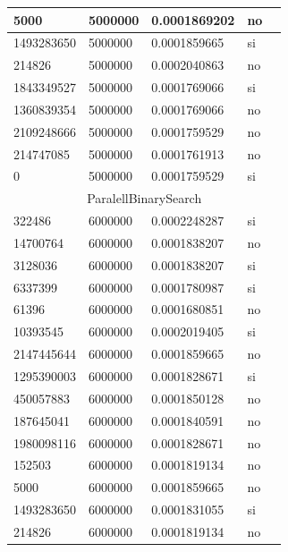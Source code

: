 \documentclass[12pt, fleqn]{article}                             %
\theoremstyle{break}                                            %
\begin{document}
\begin{longtable}{|m{5em}|m{5em}|m{10em}|m{5em}|@{}m{0pt}@{}}
            5000& 5000000  & 0.0001869202 & no &\\[1em]    \hline
            1493283650& 5000000  & 0.0001859665 & si &\\[1em]    \hline
            214826& 5000000  & 0.0002040863 & no &\\[1em]    \hline
            1843349527& 5000000  & 0.0001769066 & si &\\[1em]    \hline
            1360839354& 5000000  & 0.0001769066 & no &\\[1em]    \hline
            2109248666& 5000000  & 0.0001759529 & no &\\[1em]    \hline
            214747085& 5000000  & 0.0001761913 & no &\\[1em]    \hline
            0& 5000000  & 0.0001759529 & si &\\[1em]    \hline
            \multicolumn{5}{|c|}{ParalellBinarySearch}   \\          \hline
            322486& 6000000  & 0.0002248287 & si &\\[1em]    \hline
            14700764& 6000000  & 0.0001838207 & no &\\[1em]    \hline
            3128036& 6000000  & 0.0001838207 & si &\\[1em]    \hline
            6337399& 6000000  & 0.0001780987 & si &\\[1em]    \hline
            61396& 6000000  & 0.0001680851 & no &\\[1em]    \hline
            10393545& 6000000  & 0.0002019405 & si &\\[1em]    \hline
            2147445644& 6000000  & 0.0001859665 & no &\\[1em]    \hline
            1295390003& 6000000  & 0.0001828671 & si &\\[1em]    \hline
            450057883& 6000000  & 0.0001850128 & no &\\[1em]    \hline
            187645041& 6000000  & 0.0001840591 & no &\\[1em]    \hline
            1980098116& 6000000  & 0.0001828671 & no &\\[1em]    \hline
            152503& 6000000  & 0.0001819134 & no &\\[1em]    \hline
            5000& 6000000  & 0.0001859665 & no &\\[1em]    \hline
            1493283650& 6000000  & 0.0001831055 & si &\\[1em]    \hline
            214826& 6000000  & 0.0001819134 & no &\\[1em]    \hline

\end{longtable}
\end{document}
